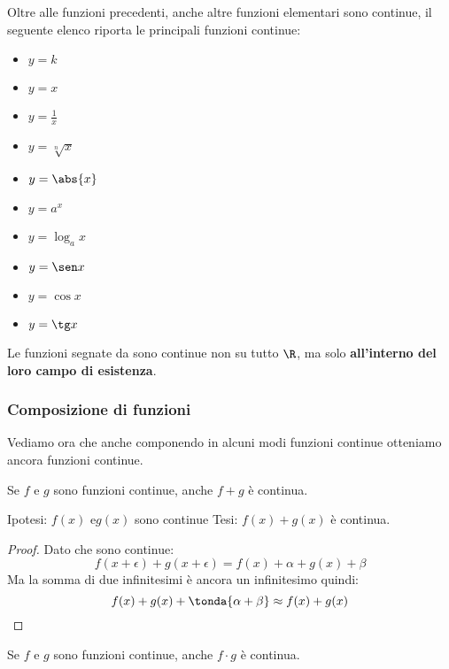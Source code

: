 Oltre alle funzioni precedenti, anche altre funzioni elementari sono continue, 
il seguente elenco riporta le principali funzioni continue:

\begin{itemize} [noitemsep]
 \item \(y=k\)
 \item \(y=x\)
 \item \(y=\frac{1}{x}\) \quad \textasteriskcentered
 \item \(y=\sqrt[n]{x}\) \quad \textasteriskcentered
 \item \(y=\abs{x}\)
 \item \(y=a^x\)
 \item \(y=\log_a x\) \quad \textasteriskcentered
 \item \(y=\sen x\)
 \item \(y=\cos x\)
 \item \(y=\tg x\) \quad \textasteriskcentered
\end{itemize}

\begin{osservazione}
Le funzioni segnate da \textasteriskcentered sono continue non su tutto \(\R\), 
ma solo \textbf{all'interno del loro campo di esistenza}.
\end{osservazione}

\subsubsection{Composizione di funzioni}
\label{subsubsec:cont_composizionefunzioni}

Vediamo ora che anche componendo in alcuni modi funzioni continue otteniamo 
ancora funzioni continue.

\begin{teorema}
Se \(f\) e \(g\) sono funzioni continue, anche \(f+g\) è continua.
\end{teorema}

\noindent Ipotesi: 
\(f(x) \text{ e} g(x)\) sono continue
\tab Tesi: 
\(f(x)+g(x)\) è continua.

\begin{proof}
Dato che sono continue: 
\[f(x+\epsilon) + g(x+\epsilon) = f(x)+\alpha + g(x)+\beta\]
Ma la somma di due infinitesimi è ancora un infinitesimo quindi:
\[f(x)+g(x)+\tonda{\alpha + \beta} \approx f(x)+g(x)\]
\end{proof}

\begin{teorema}
Se \(f\) e \(g\) sono funzioni continue, anche \(f \cdot g\) è continua.
\end{teorema}

